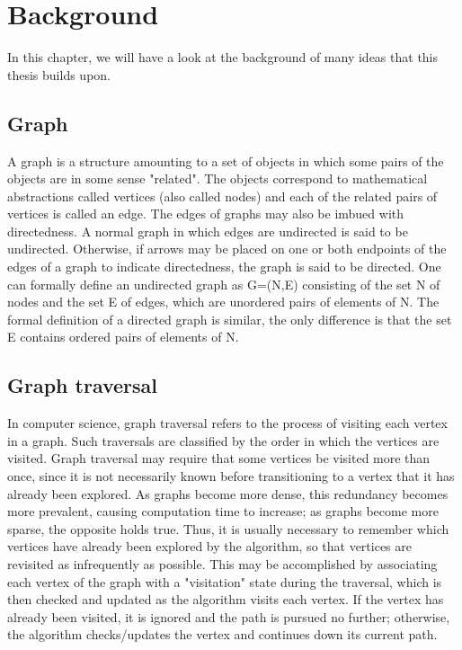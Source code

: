 \chapter{Background}
In this chapter, we will have a look at the background of many ideas that this thesis builds upon.

\section{Graph}
A graph is a structure amounting to a set of objects in which some pairs of the objects are in some sense "related". The objects correspond to mathematical abstractions called vertices (also called nodes) and each of the related pairs of vertices is called an edge. The edges of graphs may also be imbued with directedness. A normal graph in which edges are undirected is said to be undirected. Otherwise, if arrows may be placed on one or both endpoints of the edges of a graph to indicate directedness, the graph is said to be directed. One can formally define an undirected graph as G=(N,E) consisting of the set N of nodes and the set E of edges, which are unordered pairs of elements of N. The formal definition of a directed graph is similar, the only difference is that the set E contains ordered pairs of elements of N.

\section{Graph traversal}
In computer science, graph traversal refers to the process of visiting each vertex in a graph. Such traversals are classified by the order in which the vertices are visited. Graph traversal may require that some vertices be visited more than once, since it is not necessarily known before transitioning to a vertex that it has already been explored. As graphs become more dense, this redundancy becomes more prevalent, causing computation time to increase; as graphs become more sparse, the opposite holds true.
Thus, it is usually necessary to remember which vertices have already been explored by the algorithm, so that vertices are revisited as infrequently as possible. This may be accomplished by associating each vertex of the graph with a "visitation" state during the traversal, which is then checked and updated as the algorithm visits each vertex. If the vertex has already been visited, it is ignored and the path is pursued no further; otherwise, the algorithm checks/updates the vertex and continues down its current path.

